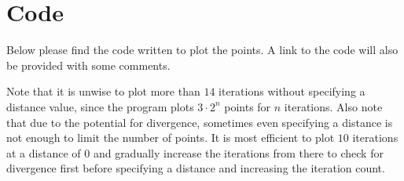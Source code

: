\documentclass[12pt,a4paper,reqno,parskip=full]{amsart}
\numberwithin{equation}{section}
\theoremstyle{plain}
\theoremstyle{definition}
\begin{document}
\newpage
\section{Code}
Below please find the code written to plot the points. A link to the code will also be provided with some comments.

Note that it is unwise to plot more than $14$ iterations without specifying a distance value, since the program plots $3\cdot2^n$ points for $n$ iterations. Also note that due to the potential for divergence, sometimes even specifying a distance is not enough to limit the number of points. It is most efficient to plot $10$ iterations at a distance of $0$ and gradually increase the iterations from there to check for divergence first before specifying a distance and increasing the iteration count. 




\end{document}
